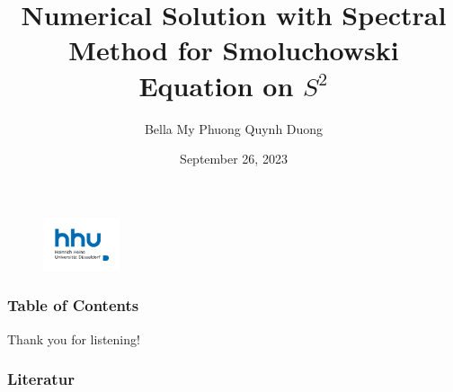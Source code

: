 \documentclass[lightblue, notheorems, xcolor=dvipsnames]{beamer}
\theoremstyle{definition}
\theoremstyle{plain}
\theoremstyle{example}
\begin{document}
  \author{Bella My Phuong Quynh Duong}
  \date{September 26, 2023} %
  \title[Structure-Preserving Multi-Scale Methods
  for Complex Fluids]{Numerical Solution with Spectral Method for Smoluchowski Equation on $S^2$}
  
  \begin{frame}
  	\titlepage
  	\begin{figure}[htpb]
  		\begin{center}
  			\includegraphics[width=0.2\textwidth]{logo.png}
  		\end{center}
  	\end{figure}
  \end{frame}
\begin{frame}
   \frametitle{Table of Contents}
\tableofcontents %
\end{frame}



%


%


\begin{frame}
	\centering
	Thank you for listening!
\end{frame}

\AtBeginSection[]





\begin{frame}[allowframebreaks]
  \frametitle{Literatur}
  \nocite{*} %
  
  
\end{frame}
\end{document}
